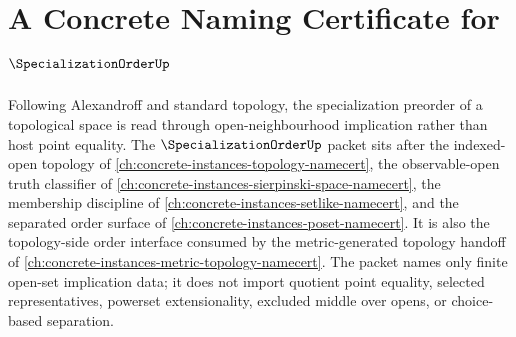 \chapter{A Concrete Naming Certificate for $\SpecializationOrderUp$}
\label{ch:concrete-instances-specialization-order-namecert}

Following Alexandroff and standard topology, the specialization preorder of a topological space is read through open-neighbourhood implication rather than host point equality. The $\SpecializationOrderUp$ packet sits after the indexed-open topology of \autoref{ch:concrete-instances-topology-namecert}, the observable-open truth classifier of \autoref{ch:concrete-instances-sierpinski-space-namecert}, the membership discipline of \autoref{ch:concrete-instances-setlike-namecert}, and the separated order surface of \autoref{ch:concrete-instances-poset-namecert}. It is also the topology-side order interface consumed by the metric-generated topology handoff of \autoref{ch:concrete-instances-metric-topology-namecert}. The packet names only finite open-set implication data; it does not import quotient point equality, selected representatives, powerset extensionality, excluded middle over opens, or choice-based separation.

